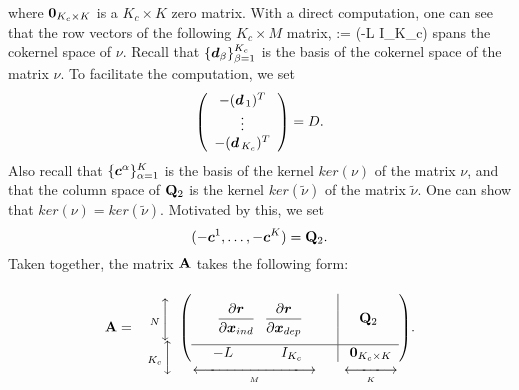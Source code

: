 \documentclass[ amsmath,amssymb,nofootinbib
]{revtex4-1}
\def\bal#1\eal{\begin{align}#1\end{align}}
\def\mbf#1{\mbox{\boldmath $#1$}}
\newcommand{\bQ}{{\bf Q}}
\newcommand{\br}{{\mbf r}}
\newcommand{\tnu}{{\tilde \nu}}
\newcommand{\p}{\partial}
\begin{document}
where ${\bf 0}_{K_c \times K}$ is a $K_c \times K$ zero matrix.
With a direct computation, one can see that
the row vectors of the following $K_c \times M$ matrix,
\bal
D := (-L \;\;  I_{K_c})
\eal
spans the cokernel space of $\nu$.
Recall that $\{{\mbf d}_\beta\}_{\beta=1}^{K_c}$ is the basis of  the cokernel space of the matrix $\nu$.
To facilitate the computation, we set
$$
      \left(
     \begin{array}{c}
       -({\mbf d}_{\,1})^T \\
       \vdots \\
       -({\mbf d}_{\,K_c})^T
      \end{array}
      \right) = D.
$$
Also recall that $\{{\mbf c}^\alpha\}_{\alpha=1}^{K}$ is the basis of  the kernel $ker(\nu)$ of the matrix $\nu$,
and that  the column space of $\bQ_2$ is  the kernel $ker(\tnu)$ of the matrix $\tnu$.
One can show that $ker(\nu) = ker(\tnu)$.
Motivated by this, we set
$$
      (-{\mbf c}^1,\ldots,-{\mbf c}^K) = \bQ_2.
$$
Taken together, the  matrix $\bf A$ takes the following form:
\begin{align}
{\bf A} = \begin{array}{c}
\\
\ _N\Bigg{\updownarrow} \\
\ _{K_c}\bigg{\updownarrow}\\
\end{array}
\underset{\underset{M}{\xlongleftrightarrow[]{\hspace{8em}}} \ \ \ \ \ \ \underset{K}{\xlongleftrightarrow[]{\hspace{3em}}}}{\left(
\begin{array}{cccc|c }
&&&&  \\
&\mbox{\smash{ $ \dfrac{\p \br  }{\p {\mbf x_{ind}}}$ \  $\dfrac{\p \br }{\p {\mbf x_{dep}}}$}}&&& { \bQ_2} \\
&&&&\\\hline
& -L   \hspace{1.2 cm}  I_{K_c}    &&&\mbox{\smash{\ ${\bf 0}_{K_c \times K}$}} \\
\end{array}
\right)}. \label{Amat2}
\end{align}


\end{document}
